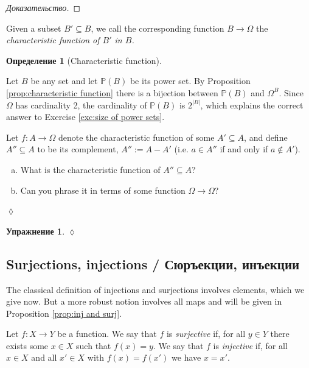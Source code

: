 \documentclass[a4paper]{book}
\def\PP{{\mathbb P}}
\def\to{\rightarrow}
\def\taking{\colon}
\def\ss{\subseteq}
\theoremstyle{myth}
\newtheorem{excENG}[envENG]{\begin{english}Exercise\end{english}}
\newtheorem{definitionENG}[envENG]{\begin{english}Definition\end{english}}
\newenvironment{exerciseENG}{\begin{excENG}}{\hspace*{\fill}$\lozenge$\end{excENG}}
\newtheorem{excRUS}[envRUS]{Упражнение}
\newtheorem{definitionRUS}[envRUS]{Определение}
\newenvironment{proofRUS}{\begin{proof}[Доказательство]}{\end{proof}}
\newenvironment{exerciseRUS}{\begin{excRUS}}{\hspace*{\fill}$\lozenge$\end{excRUS}}
\def\sexc{\begin{enumerate}[a.)]\setlength{\itemsep}{.1cm}\setlength{\parskip}{.1cm}\item}
\def\next{\item}
\def\endsexc{\end{enumerate}}
\begin{document}
\begin{russian}
\begin{proofRUS}
 
\end{proofRUS}

\begin{definitionENG}

Given a subset $B'\ss B$, we call the corresponding function $B\to\Omega$ the {\em characteristic function of $B'$ in $B$.}
\end{definitionENG}

\begin{definitionRUS}[Characteristic function]
 
\end{definitionRUS}

Let $B$ be any set and let $\PP(B)$ be its power set. By Proposition \ref{prop:characteristic function} there is a bijection between $\PP(B)$ and $\Omega^B$. Since $\Omega$ has cardinality 2, the cardinality of $\PP(B)$ is $2^{|B|}$, which explains the correct answer to Exercise \ref{exc:size of power sets}.

 

\begin{exerciseENG}
Let $f\taking A\to\Omega$ denote the characteristic function of some $A'\ss A$, and define $A''\ss A$ to be its complement, $A'':=A-A'$ (i.e. $a\in A''$ if and only if $a\not\in A'$). 
\sexc What is the characteristic function of $A''\ss A$? 
\next Can you phrase it in terms of some function $\Omega\to\Omega$?
\endsexc
\end{exerciseENG}

\begin{exerciseRUS}
 
\end{exerciseRUS}


\subsection{Surjections, injections / Сюръекции, инъекции}

The classical definition of injections and surjections involves elements, which we give now. But a more robust notion involves all maps and will be given in Proposition \ref{prop:inj and surj}.

 

\begin{definitionENG}\label{def:inj,surj,bij}
Let $f\taking X\to Y$ be a function. We say that $f$ is {\em surjective} if, for all $y\in Y$ there exists some $x\in X$ such that $f(x)=y$. We say that $f$ is {\em injective} if, for all $x\in X$ and all $x'\in X$ with $f(x)=f(x')$ we have $x=x'$.


\end{definitionENG}
\end{russian}
\end{document}
